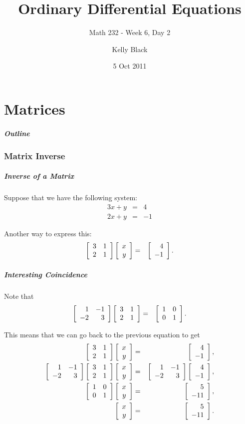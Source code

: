 \part{Matrices}






\title{Ordinary Differential Equations}
\subtitle{Math 232 - Week 6, Day 2}

\author{Kelly Black}
\date{5 Oct 2011}

\begin{frame}
  \titlepage
\end{frame}

\begin{frame}
  \frametitle{Outline}
\end{frame}


\section{Matrix Inverse}


\begin{frame}
  \frametitle{Inverse of a Matrix}

  Suppose that we have the following system:
  \begin{eqnarray*}
    3x + y & = & 4 \\
    2x + y & = & -1
  \end{eqnarray*}

  Another way to express this:
  \begin{eqnarray*}
    \arrayTwo{3}{1}{2}{1} \vecTwo{x}{y} & = & \vecTwo{4}{-1}.
  \end{eqnarray*}

\end{frame}


\begin{frame}
  \frametitle{Interesting Coincidence}

  Note that
  \begin{eqnarray*}
    \arrayTwo{1}{-1}{-2}{3} \arrayTwo{3}{1}{2}{1}  & = & \arrayTwo{1}{0}{0}{1}.
  \end{eqnarray*}

  This means that we can go back to the previous equation to get
  \begin{eqnarray*}
    \arrayTwo{3}{1}{2}{1} \vecTwo{x}{y} & = & \vecTwo{4}{-1}, \\
    \arrayTwo{1}{-1}{-2}{3} \arrayTwo{3}{1}{2}{1} \vecTwo{x}{y} & = & 
          \arrayTwo{1}{-1}{-2}{3}\vecTwo{4}{-1}, \\
    \arrayTwo{1}{0}{0}{1} \vecTwo{x}{y} & = & \vecTwo{5}{-11}, \\
    \vecTwo{x}{y} & = & \vecTwo{5}{-11}.
  \end{eqnarray*}


\end{frame}

